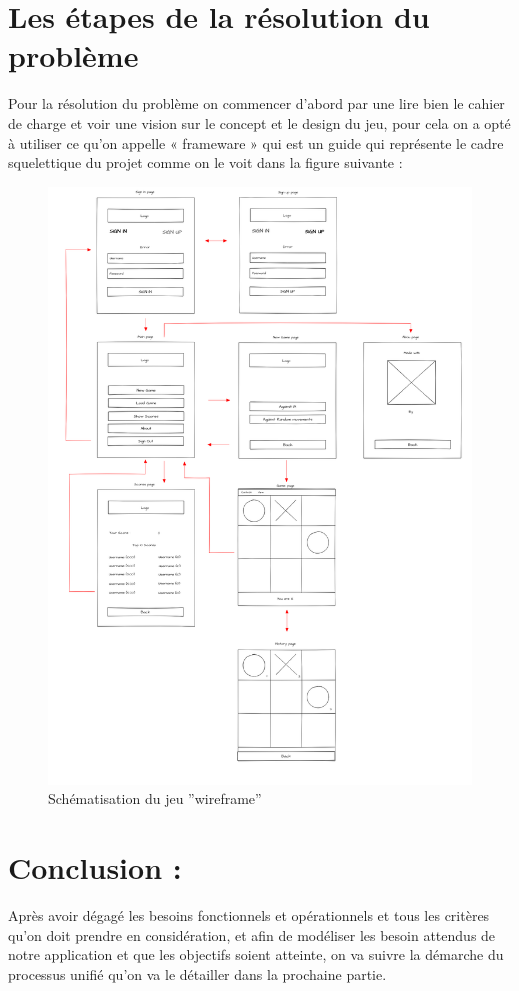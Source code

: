 \section{Les étapes de la résolution du problème}\label{sec:section3}
Pour la résolution du problème on commencer d’abord par une lire bien le cahier de charge et voir une vision sur le concept et le design du jeu, pour cela on a opté à utiliser ce qu’on appelle « frameware » qui est un guide qui représente le cadre squelettique du projet comme on le voit dans la figure suivante :
\clearpage
\begin{figure}[H]
	\centering
	\includegraphics[width=1\textwidth]{wireframe.PNG}
	  \caption{Schématisation du jeu ''wireframe''}
	\label{fig: Schématisation du jeu ''wireframe''}
\end{figure}
\section{Conclusion :}\label{sec:section4}
Après avoir dégagé les besoins fonctionnels et opérationnels et tous les critères qu’on doit prendre en considération, et afin de modéliser les besoin attendus de notre application et que les objectifs soient atteinte, on va suivre la démarche du processus unifié qu’on va le détailler dans la prochaine partie.
\cleardoublepage
